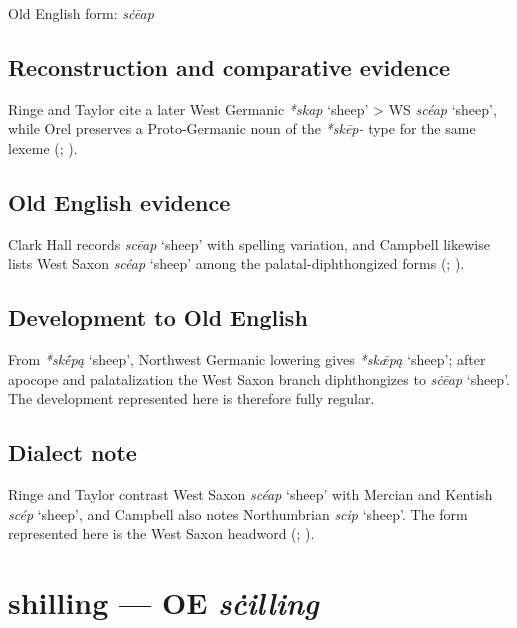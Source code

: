 \documentclass[
  british,
  a4paper,
  openany]{book}
\providecommand{\Recon}[1]{\emph{*#1}}
{\catcode`→=\active \global\def→{\ensuremath{\rightarrow}}}
\providecommand{\texorpdfstring}[2]{#1}
\providecommand{\Recon}[1]{\emph{*#1}}
{\catcode`→=\active \global\def→{\ensuremath{\rightarrow}}}
\begin{document}
Old English form: \emph{sċēap}

\subsection{Reconstruction and comparative
evidence}\label{reconstruction-and-comparative-evidence-43}

Ringe and Taylor cite a later West Germanic \emph{*skap} `sheep'
\textgreater{} WS \emph{scéap} `sheep', while Orel preserves a
Proto-Germanic noun of the \emph{*skēp-} type for the same lexeme
(;
).

\subsection{Old English evidence}\label{old-english-evidence-43}

Clark Hall records \emph{scēap} `sheep' with spelling variation, and
Campbell likewise lists West Saxon \emph{scéap} `sheep' among the
palatal-diphthongized forms (; ).

\subsection{Development to Old
English}\label{development-to-old-english-43}

From \Recon{skḗpą} `sheep', Northwest Germanic lowering gives
\Recon{skǣpą} `sheep'; after apocope and palatalization the West Saxon
branch diphthongizes to \emph{sċēap} `sheep'. The development
represented here is therefore fully regular.

\subsection{Dialect note}\label{dialect-note-4}

Ringe and Taylor contrast West Saxon \emph{scéap} `sheep' with Mercian
and Kentish \emph{scép} `sheep', and Campbell also notes Northumbrian
\emph{scip} `sheep'. The form represented here is the West Saxon
headword (;
).

\section{\texorpdfstring{shilling --- OE
\emph{sċilling}}{shilling --- OE sċilling}}\label{shilling-oe-sux10billing}
\end{document}
